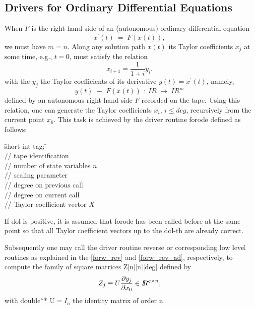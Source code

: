 \documentclass[11pt,twoside]{article}
\begin{document}
\subsection{Drivers for Ordinary Differential Equations}
\label{odedrivers}
%
When $F$ is the right-hand side of an (autonomous) ordinary
differential equation  
\[
x^\prime(t) \; = \; F(x(t)) ,  
\] 
we must have $m=n$. Along any solution path $x(t)$ its Taylor
coefficients $x_j$ at some time, e.g., $t=0$, must satisfy
the relation 
\[
 x_{i+1} = \frac{1}{1+i} y_i. 
\]
with the $y_j$ the Taylor coefficients of its derivative $y(t)=x^\prime(t)$, namely, 
\[
 y(t) \; \equiv \; F(x(t)) \; : \;  I\!\!R \;\mapsto \;I\!\!R^m 
\]
defined by an autonomous right-hand side $F$ recorded on the tape.
Using this relation, one can generate the Taylor coefficients $x_i$,
$i \le deg$,
recursively from the current point $x_0$. This task is achieved by the
driver routine {\sf forode} defined as follows:
%
\begin{tabbing}
\hspace{0.5in}\={\sf short int tag;} \hspace{1.1in}\= \kill    %
\\
         \> // tape identification \\
                 \> // number of state variables $n$\\
            \> // scaling parameter\\
               \> // degree on previous call\\
               \> // degree on current call\\
    \> // Taylor coefficient vector $X$
\end{tabbing}
%
If {\sf dol} is positive, it is assumed that {\sf forode}
has been called before at the same point so that all Taylor coefficient
vectors up to the {\sf dol}-th are already correct. 

Subsequently one may call the driver routine {\sf reverse} or corresponding
low level routines as explained in the \autoref{forw_rev} and
\autoref{forw_rev_ad}, respectively, to compute
the family of square matrices {\sf Z[n][n][deg]} defined by
\[
Z_j \equiv U\/\frac{\partial y_j}{\partial x_0} \in{I\!\!R}^{q \times n} ,
\]
with {\sf double** U}$=I_n$ the identity matrix of order {\sf n}. 
\end{document}
